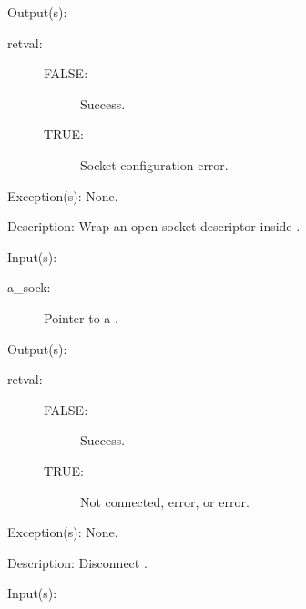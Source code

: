 \begin{capi}
\begin{capilist}
\begin{description}
		\end{description}
	\item[Output(s): ]
		\begin{description}\item[]
		\item[retval: ]
			\begin{description}\item[]
			\item[FALSE: ] Success.
			\item[TRUE: ] Socket configuration error.
			\end{description}
		\end{description}
	\item[Exception(s): ] None.
	\item[Description: ]
		Wrap an open socket descriptor inside .
	\end{capilist}
\label{sock_disconnect}
	\begin{capilist}
	\item[Input(s): ]
		\begin{description}\item[]
		\item[a\_sock: ]
			Pointer to a .
		\end{description}
	\item[Output(s): ]
		\begin{description}\item[]
		\item[retval: ]
			\begin{description}\item[]
			\item[FALSE: ]
				Success.
			\item[TRUE: ]
				Not connected,  error, or
				 error.
			\end{description}
		\end{description}
	\item[Exception(s): ] None.
	\item[Description: ]
		Disconnect .
	\end{capilist}
\label{sock_buffered_in}
	\begin{capilist}
	\item[Input(s): ]
		\begin{description}\item[]

\end{description}
\end{capilist}
\end{capi}

